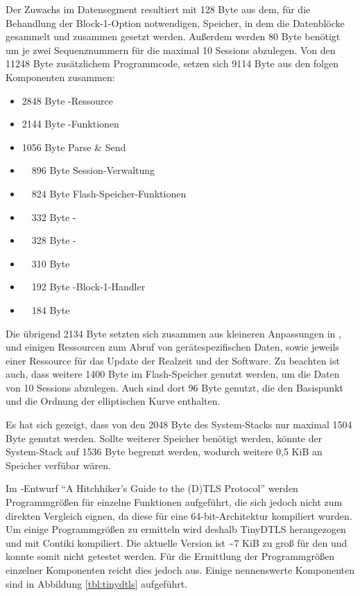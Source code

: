 Der Zuwachs im Datensegment resultiert mit 128 Byte aus dem, für die Behandlung der Block-1-Option notwendigen, Speicher, in dem die Datenblöcke gesammelt und
zusammen gesetzt werden. Außerdem werden 80 Byte benötigt um je zwei Sequenznummern für die maximal 10 Sessions abzulegen. Von den 11248 Byte zusätzlichem
Programmcode, setzen sich 9114 Byte aus den folgen Komponenten zusammen:
\begin{itemize}
  \item  2848 Byte -Ressource
  \item  2144 Byte -Funktionen
  \item  1056 Byte Parse \& Send
  \item ~~896 Byte Session-Verwaltung
  \item ~~824 Byte Flash-Speicher-Funktionen
  \item ~~332 Byte -
  \item ~~328 Byte -
  \item ~~310 Byte 
  \item ~~192 Byte -Block-1-Handler
  \item ~~184 Byte 
\end{itemize}
Die übrigend 2134 Byte setzten sich zusammen aus kleineren Anpassungen in , und einigen Ressourcen zum Abruf von gerätespezifischen Daten,
sowie jeweils einer Ressource für das Update der Realzeit und der Software. Zu beachten ist auch, dass weitere 1400 Byte im Flash-Speicher genutzt werden,
um die Daten von 10 Sessions abzulegen. Auch sind dort 96 Byte genutzt, die den Basispunkt und die Ordnung der elliptischen Kurve enthalten.

Es hat sich gezeigt, dass von den 2048 Byte des System-Stacks nur maximal 1504 Byte genutzt werden. Sollte weiterer Speicher benötigt werden, könnte
der System-Stack auf 1536 Byte begrenzt werden, wodurch weitere 0,5 KiB an Speicher verfübar wären.

%
Im -Entwurf "`A Hitchhiker's Guide to the (D)TLS Protocol"' \cite{draftmintls} werden Programmgrößen für einzelne
Funktionen aufgeführt, die sich jedoch nicht zum direkten Vergleich eignen, da diese für eine 64-bit-Architektur kompiliert wurden.
Um einige Programmgrößen zu ermitteln wird deshalb TinyDTLS \cite{tinydtls} herangezogen und mit Contiki kompiliert.
Die aktuelle Version ist \textasciitilde 7 KiB zu groß für den  und konnte somit nicht getestet werden. Für die Ermittlung
der Programmgrößen einzelner Komponenten reicht dies jedoch aus. Einige nennenswerte Komponenten sind in Abbildung \ref{tbl:tinydtls} aufgeführt.

